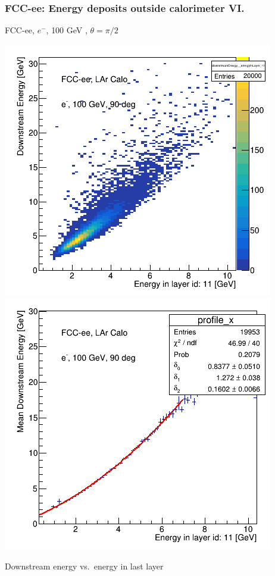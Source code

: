 \documentclass[aspectratio=169]{beamer}
\newcommand{\redtext}[1]{%
  \textcolor{myRed}{#1}
}
\begin{document}
\begin{frame}
  \frametitle{FCC-ee: Energy deposits outside calorimeter VI.}

  \centering
  FCC-ee, $e^{-}$, \redtext{100 GeV}, $\theta = \pi/2$ \\[1.5ex]
  \begin{adjustwidth}{-9mm}{-9mm}
    \includegraphics[width=0.49\linewidth]{figures/12layers/hist_downstream_vs_layer_11_90deg_100GeV.png}
    \includegraphics[width=0.49\linewidth]{figures/12layers/profile_downstream_vs_layer_11_90deg_100GeV.png}
  \end{adjustwidth}
  \redtext{Downstream} energy vs.\ energy in last layer
\end{frame}
\end{document}

